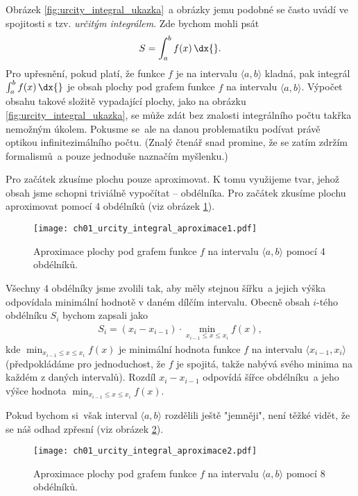 Obrázek \ref{fig:urcity_integral_ukazka}~a obrázky jemu podobné se často uvádí ve spojitosti s tzv. \emph{určitým integrálem}. Zde bychom mohli psát
\begin{align*}
S=\int_{a}^{b}{f(x)\,\dx{}}.
\end{align*}
Pro upřesnění, pokud platí, že funkce $f$ je na intervalu $\langle a,b \rangle$ kladná, pak integrál $\int_a^b{f(x)\,\dx{}}$ je obsah plochy pod grafem funkce $f$ na intervalu $\langle a,b \rangle$. Výpočet obsahu takové složitě vypadající plochy, jako na obrázku \ref{fig:urcity_integral_ukazka}, se může zdát bez znalosti integrálního počtu takřka nemožným úkolem. Pokusme se~ale na danou problematiku podívat právě optikou infinitezimálního počtu. (Znalý čtenář snad promine, že se zatím zdržím formalismů~a pouze jednoduše naznačím myšlenku.)\par
Pro začátek zkusíme plochu pouze aproximovat. K tomu využijeme tvar, jehož obsah jsme schopni triviálně vypočítat -- obdélníka. Pro začátek zkusíme plochu aproximovat pomocí 4 obdélníků (viz obrázek \ref{fig:urcity_integral_aproximace1}).
\begin{figure}[H]
	\centering
	\texttt{[image: ch01\_urcity\_integral\_aproximace1.pdf]}
	\caption{Aproximace plochy pod grafem funkce $f$ na intervalu $\langle a,b \rangle$ pomocí 4 obdélníků.}
	\label{fig:urcity_integral_aproximace1}
\end{figure}
Všechny 4 obdélníky jsme zvolili tak, aby měly stejnou šířku~a jejich výška odpovídala minimální hodnotě v daném dílčím intervalu. Obecně obsah $i$-tého obdélníku $S_i$ bychom zapsali jako
\begin{align*}
S_i= (x_i-x_{i-1}) \cdot \min\limits_{x_{i-1} \leq x \leq x_i}{f(x)},
\end{align*}
kde $\min_{x_{i-1} \leq x \leq x_i}{f(x)}$ je minimální hodnota funkce $f$ na intervalu $\langle x_{i-1},x_i \rangle$ (předpokládáme pro jednoduchost, že $f$ je spojitá, takže nabývá svého minima na každém z daných intervalů). Rozdíl $x_i-x_{i-1}$ odpovídá šířce obdélníku~a jeho výšce hodnota $\min_{x_{i-1} \leq x \leq x_i}{f(x)}$.\par
Pokud bychom si~však interval $\langle a,b \rangle$ rozdělili ještě "jemněji", není těžké vidět, že se náš odhad zpřesní (viz obrázek \ref{fig:urcity_integral_aproximace2}).
\begin{figure}[H]
	\centering	\texttt{[image: ch01\_urcity\_integral\_aproximace2.pdf]}
	\caption{Aproximace plochy pod grafem funkce $f$ na intervalu $\langle a,b \rangle$ pomocí 8 obdélníků.}
	\label{fig:urcity_integral_aproximace2}
\end{figure}
